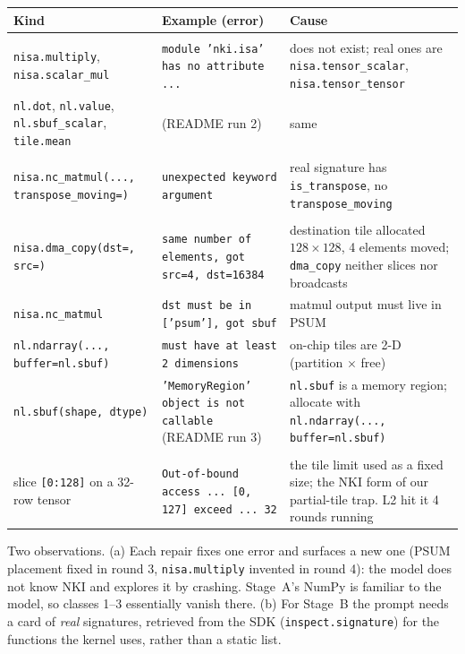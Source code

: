 \documentclass[11pt]{article}
\newcommand{\code}[1]{\texttt{#1}}
\begin{document}
\noindent\begin{tabularx}{\linewidth}{@{}>{\raggedright\arraybackslash}p{4.2cm}>{\raggedright\arraybackslash}p{5.2cm}Y@{}}
\toprule
Kind & Example (error) & Cause \\
\midrule
{} \\
\code{nisa.multiply}, \code{nisa.scalar\_mul} & \code{module 'nki.isa' has no attribute ...} & does not exist;
  real ones are \code{nisa.tensor\_scalar}, \code{nisa.tensor\_tensor} \\
\code{nl.dot}, \code{nl.value}, \code{nl.sbuf\_scalar}, \code{tile.mean} & (README run 2) & same \\
\midrule
{} \\
\code{nisa.nc\_matmul(..., transpose\_moving=)} & \code{unexpected keyword argument} & real signature has
  \code{is\_transpose}, no \code{transpose\_moving} \\
\midrule
{} \\
\code{nisa.dma\_copy(dst=, src=)} & \code{same number of elements, got src=4, dst=16384} & destination tile
  allocated $128\times128$, 4 elements moved; \code{dma\_copy} neither slices nor broadcasts \\
\code{nisa.nc\_matmul} & \code{dst must be in ['psum'], got sbuf} & matmul output must live in PSUM \\
\code{nl.ndarray(..., buffer=nl.sbuf)} & \code{must have at least 2 dimensions} & on-chip tiles are 2-D
  (partition $\times$ free) \\
\code{nl.sbuf(shape, dtype)} & \code{'MemoryRegion' object is not callable} (README run 3) &
  \code{nl.sbuf} is a memory region; allocate with \code{nl.ndarray(..., buffer=nl.sbuf)} \\
\midrule
{} \\
slice \code{[0:128]} on a 32-row tensor & \code{Out-of-bound access ... [0, 127] exceed ... 32} &
  the tile limit used as a fixed size; the NKI form of our partial-tile trap. L2 hit it 4 rounds running \\
\bottomrule
\end{tabularx}

\medskip
Two observations. (a) Each repair fixes one error and surfaces a new one (PSUM placement fixed in
round 3, \code{nisa.multiply} invented in round 4): the model does not know NKI and explores it by
crashing. Stage~A's NumPy is familiar to the model, so classes 1--3 essentially vanish there.
(b) For Stage~B the prompt needs a card of \emph{real} signatures, retrieved from the SDK
(\code{inspect.signature}) for the functions the kernel uses, rather than a static list.
\end{document}
